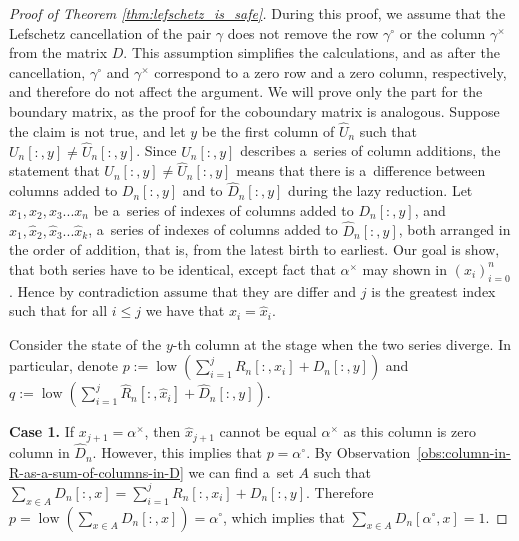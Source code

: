 \documentclass[a4paper,12pt, USenglish,cleveref,autoref,thm-restate]{article}
\newcommand\jakub[1]{\textcolor{blue}{[JL: #1]}}
\DeclareMathOperator{\low}{low}
\newcommand{\mU}{U}
\newcommand{\hmU}{\mU}
\newcommand{\hmUaft}{\hat{\mU}}
\newcommand{\mB}{D}
\newcommand{\hmB}{D}
\newcommand{\hmBaft}{\hat{\mB}}
\newcommand{\mR}{R}
\newcommand{\hmR}{R}
\newcommand{\mD}{D}
\newcommand{\cx}{x}
\newcommand{\cy}{y}
\newcommand{\cp}{p}
\newcommand{\cq}{q}
\newcommand{\bth}[1]{#1^\circ}
\newcommand{\dth}[1]{#1^{\!\times}}
\newcommand{\bds}{\alpha}
\newcommand{\bdb}{\gamma}
\begin{document}
\begin{appendices}
\begin{proof}[Proof of Theorem \ref{thm:lefschetz_is_safe}]
       During this proof, we assume that the Lefschetz cancellation of the pair $\bdb$ does not remove the row $\bth\bdb$ or the column $\dth\bdb$ from the matrix $\mD$. This assumption simplifies the calculations, and as after the cancellation, $\bth\bdb$ and $\dth\bdb$ correspond to a zero row and a zero column, respectively, and therefore do not affect the argument. We will prove only the part for the boundary matrix, as the proof for the coboundary matrix is analogous.
    Suppose the claim is not true, and let $\cy$ be the first column of $\hmUaft_n$ such that $\hmU_n[:,y] \neq \hmUaft_n[:,y]$.
    Since $\hmU_n[:,y]$ describes a~series of column additions, the statement that $\hmU_n[:,y] \neq \hmUaft_n[:,y]$ means that there is a~difference between columns added to $\hmB_n[:,y]$ and to $\hmBaft_n[:,y]$ during the lazy reduction. Let $x_1,x_2,x_3...x_n$ be a~series of indexes of columns added to $\hmB_n[:,y]$, and $\hat{x}_1,\hat{x}_2,\hat{x}_3...\hat{x}_k$, a~series of indexes of columns added to $\hmBaft_n[:,y]$, both arranged in the order of addition, that is, from the latest birth to earliest. 
    Our goal is show, that both series have to be identical, except fact that $\dth\bds$ may shown in $(x_i)_{i=0}^{n}$. Hence by contradiction assume that they are differ and $j$ is the greatest index such that for all $i \leq j$ we have that $x_i = \hat{x}_i$.


    \noindent Consider the state of the $\cy$-th column at the stage when the two series diverge. 
     In particular, denote 
        $\cp := \low \left(\sum\limits_{i = 1}^{j} \hmR_n[:,\cx_i{}] + \hmB_n[:,\cy] \right)$ 
        and $\cq := \low \left( \sum\limits_{i = 1}^{j}\hat{R}_n[:,\hat{x}_i] + \hmBaft_n[:,\cy] \right)$.

    \textbf{Case 1.}
    If $x_{j+1} = \dth\bds$, then $\hat{x}_{j+1}$ cannot be equal $\dth\bds$ as this column is zero column in $\hmBaft_n$. 
    However, this implies that $ p = \bth\bds$. 
    By Observation~\ref{obs:column-in-R-as-a-sum-of-columns-in-D} we can find a~set $A$ 
     such that
    $\sum\limits_{\cx  \in A} D_n[:,\cx]= \sum\limits_{i = 1}^{j} \hmR_n[:,\cx_i{}] + \hmB_n[:,\cy].$ 
    Therefore $p =\low \left(\sum\limits_{\cx  \in A} D_n[:,\cx] \right) = \bth\bds$, which implies that $\sum\limits_{\cx  \in A} D_n[\bth\bds,\cx] = 1$.
    

\end{proof}
\end{appendices}
\end{document}
